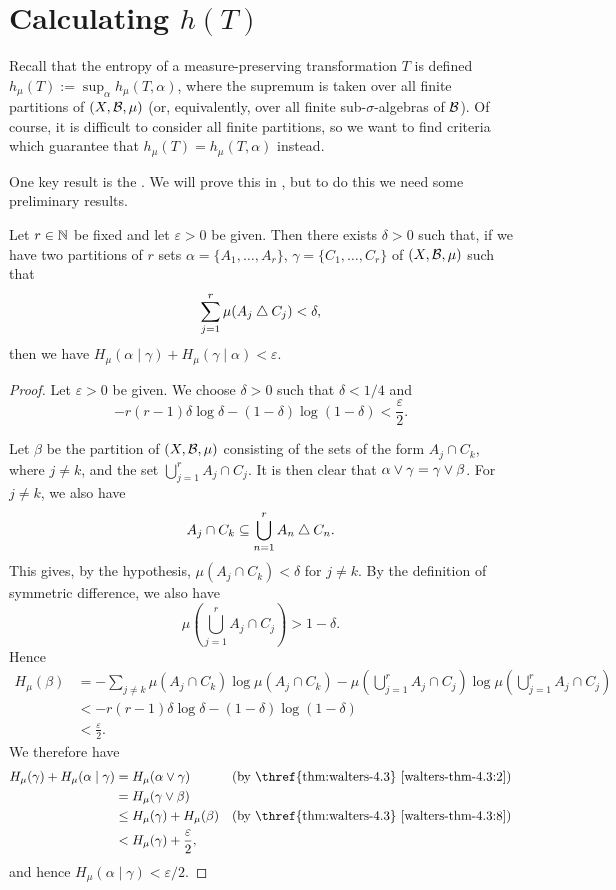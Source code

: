 \section{Calculating \texorpdfstring{$h(T)$}{h(T)}}
Recall that the entropy of a measure-preserving transformation $T$ is defined $h_\mu(T) := \sup_{\alpha}{h_\mu(T, \alpha)}$, where the supremum is taken over all finite partitions of $(X, \mathcal{B}, \mu)$ (or, equivalently, over all finite sub-$\sigma$-algebras of $\mathcal{B}$). Of course, it is difficult to consider all finite partitions, so we want to find criteria which guarantee that $h_\mu(T) = h_\mu(T, \alpha)$ instead.

One key result is the . We will prove this in , but to do this we need some preliminary results.

\begin{lemma} \label{lem:walters-4-15}
	Let $r \in \mathbb{N}$ be fixed and let $\varepsilon > 0$ be given. Then there exists $\delta > 0$ such that, if we have two partitions of $r$ sets $\alpha = \{A_1, \dots, A_r\}$, $\gamma = \{C_1, \dots, C_r\}$ of $(X, \mathcal{B}, \mu)$ such that
	\[
		\sum_{j = 1}^r{\mu(A_j \bigtriangleup C_j)} < \delta,
	\]
	then we have $H_\mu(\alpha \mid \gamma) + H_\mu(\gamma \mid \alpha) < \varepsilon$.
	\begin{proof}
		Let $\varepsilon > 0$ be given. We choose $\delta > 0$ such that $\delta < 1 / 4$ and
		\[
			-r(r - 1) \delta \log{\delta} - (1 - \delta) \log(1 - \delta) < \frac{\varepsilon}{2}.
		\]
		
		Let $\beta$ be the partition of $(X, \mathcal{B}, \mu)$ consisting of the sets of the form $A_j \cap C_k$, where $j \neq k$, and the set $\bigcup_{j = 1}^r{A_j \cap C_j}$. It is then clear that $\alpha \vee \gamma = \gamma \vee \beta$. For $j \neq k$, we also have
		\[
			A_j \cap C_k \subseteq \bigcup_{n = 1}^r{A_n \bigtriangleup C_n}.
		\]
		This gives, by the hypothesis, $\mu(A_j \cap C_k) < \delta$ for $j \neq k$. By the definition of symmetric difference, we also have
		\[
			\mu\left(\bigcup_{j = 1}^r{A_j \cap C_j}\right) > 1 - \delta.
		\]
		Hence
		\begin{align*}
			H_\mu(\beta) &= -\sum_{j \neq k}{\mu(A_j \cap C_k) \log{\mu(A_j \cap C_k)}} - \mu\left(\bigcup_{j = 1}^r{A_j \cap C_j}\right) \log{\mu\left(\bigcup_{j = 1}^r{A_j \cap C_j}\right)} \\
				&< -r(r - 1) \delta \log{\delta} - (1 - \delta) \log(1 - \delta) \\
				&< \frac{\varepsilon}{2}.
		\end{align*}
		We therefore have
		\begin{align*}
			H_\mu(\gamma) + H_\mu(\alpha \mid \gamma) &= H_\mu(\alpha \join \gamma) & \text{(by \thref{thm:walters-4.3} \ref{walters-thm-4.3:2})} \\
				&= H_\mu(\gamma \join \beta) \\
				&\leq H_\mu(\gamma) + H_\mu(\beta) & \text{(by \thref{thm:walters-4.3} \ref{walters-thm-4.3:8})} \\
				&< H_\mu(\gamma) + \frac{\varepsilon}{2},
		\end{align*}
		and hence $H_\mu(\alpha \mid \gamma) < \varepsilon / 2$.
		

\end{proof}
\end{lemma}
